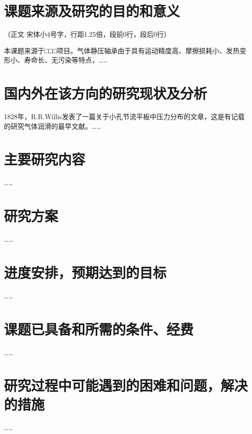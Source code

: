 
\section{课题来源及研究的目的和意义}

（正文  宋体小4号字，行距1.25倍，段前0行，段后0行）

本课题来源于□□□项目。气体静压轴承由于具有运动精度高、摩擦损耗小、发热变形小、寿命长、无污染等特点，……

\section{国内外在该方向的研究现状及分析}

1828年，R.R.Willis\cite{zhao1998}发表了一篇关于小孔节流平板中压力分布的文章，这是有记载的研究气体润滑的最早文献。……

\section{主要研究内容}

……

\section{研究方案}

……

\section{进度安排，预期达到的目标}

……

\section{课题已具备和所需的条件、经费}

……

\section{研究过程中可能遇到的困难和问题，解决的措施}

……
